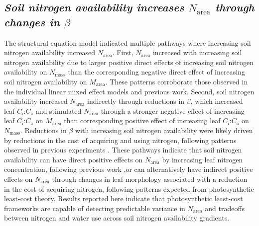 \begin{singlespace}
\subsection{\textit{Soil nitrogen availability increases $N_\mathrm{area}$ through changes in $\beta$}}
\end{singlespace}
\noindent The structural equation model indicated multiple pathways where increasing soil nitrogen availability increased $N_\mathrm{area}$. First, $N_\mathrm{area}$ increased with increasing soil nitrogen availability due to larger positive direct effects of increasing soil nitrogen availability on $N_\mathrm{mass}$ than the corresponding negative direct effect of increasing soil nitrogen availability on $M_\mathrm{area}$. These patterns corroborate those observed in the individual linear mixed effect models and previous work. Second, soil nitrogen availability increased $N_\mathrm{area}$ indirectly through reductions in $\beta$, which increased leaf $C_\mathrm{i}$:$C_\mathrm{a}$ and stimulated $N_\mathrm{area}$ through a stronger negative effect of increasing leaf $C_\mathrm{i}$:$C_\mathrm{a}$ on $M_\mathrm{area}$ than corresponding positive effect of increasing leaf $C_\mathrm{i}$:$C_\mathrm{a}$ on $N_\mathrm{mass}$. Reductions in $\beta$ with increasing soil nitrogen availability were likely driven by reductions in the cost of acquiring and using nitrogen, following patterns observed in previous experiments . These pathways indicate that soil nitrogen availability can have direct positive effects on $N_\mathrm{area}$ by increasing leaf nitrogen concentration, following previous work ,or can alternatively have indirect positive effects on $N_\mathrm{area}$ through changes in leaf morphology associated with a reduction in the cost of acquiring nitrogen, following patterns expected from photosynthetic least-cost theory. Results reported here indicate that photosynthetic least-cost frameworks are capable of detecting predictable variance in $N_\mathrm{area}$ and tradeoffs between nitrogen and water use across soil nitrogen availability gradients.

